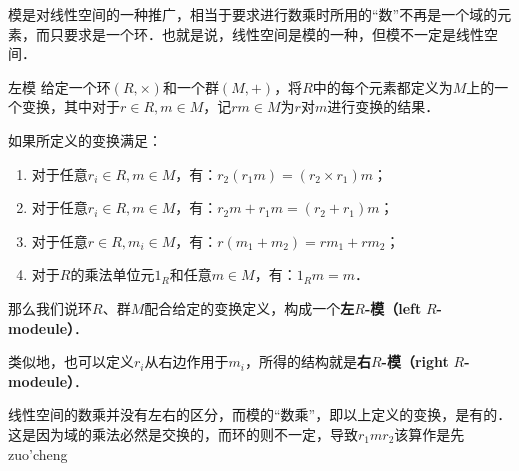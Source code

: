 

模是对线性空间的一种推广，相当于要求进行数乘时所用的“数”不再是一个域的元素，而只要求是一个环．也就是说，线性空间是模的一种，但模不一定是线性空间．

\begin{definition}{左模}
给定一个环$(R, \times)$和一个群$(M, +)$，将$R$中的每个元素都定义为$M$上的一个变换，其中对于$r\in R, m\in M$，记$rm\in M$为$r$对$m$进行变换的结果．

如果所定义的变换满足：
\begin{enumerate}
\item 对于任意$r_i\in R, m\in M$，有：$r_2(r_1m)=(r_2\times r_1)m$；
\item 对于任意$r_i\in R, m\in M$，有：$r_2m+r_1m=(r_2+r_1)m$；
\item 对于任意$r\in R, m_i\in M$，有：$r(m_1+m_2)=rm_1+rm_2$；
\item 对于$R$的乘法单位元$1_R$和任意$m\in M$，有：$1_Rm=m$．
\end{enumerate}

那么我们说环$R$、群$M$配合给定的变换定义，构成一个\textbf{左}$R$\textbf{-模（left} $R$\textbf{-modeule）}．
\end{definition}

类似地，也可以定义$r_i$从右边作用于$m_i$，所得的结构就是\textbf{右}$R$\textbf{-模（right} $R$\textbf{-modeule）}．

线性空间的数乘并没有左右的区分，而模的“数乘”，即以上定义的变换，是有的．这是因为域的乘法必然是交换的，而环的则不一定，导致$r_1mr_2$该算作是先zuo'cheng









